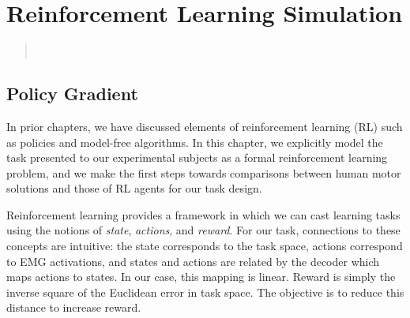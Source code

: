 \documentclass[../main.tex]{subfiles}
\begin{document}
\chapter{Reinforcement Learning Simulation}\label{chap:reinforce}

\begin{quote}
  \\
\end{quote}
\cleardoublepage%

\section{Policy Gradient}

In prior chapters, we have discussed elements of reinforcement learning (RL) such as policies and model-free algorithms. In this chapter, we explicitly model the task presented to our experimental subjects as a formal reinforcement learning problem, and we make the first steps towards comparisons between human motor solutions and those of RL agents for our task design. 

Reinforcement learning provides a framework in which we can cast learning tasks using the notions of \textit{state}, \textit{actions}, and \textit{reward}. For our task, connections to these concepts are intuitive: the state corresponds to the task space, actions correspond to EMG activations, and states and actions are related by the decoder which maps actions to states. In our case, this mapping is linear. Reward is simply the inverse square of the Euclidean error in task space. The objective is to reduce this distance to increase reward.
\end{document}
